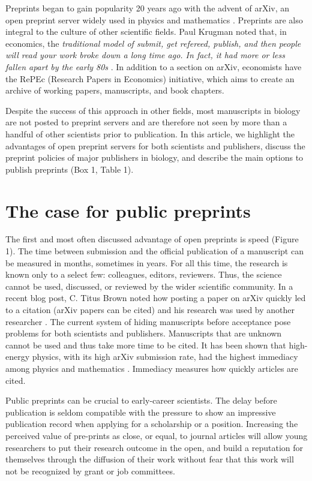 \documentclass[10pt]{article}
\begin{document}
Preprints began to gain popularity 20 years ago with the advent of arXiv, an
open preprint server widely used in physics and mathematics \cite{gin11}.
Preprints are also integral to the culture of other scientific fields.  Paul
Krugman noted that, in economics, the \emph{traditional model of submit, get
refereed, publish, and then people will read your work broke down a long time
ago. In fact, it had more or less fallen apart by the early 80s} \cite{kru12}.
In addition to a section on arXiv, economists have the RePEc (Research Papers in
Economics) initiative, which aims to create an archive of working papers,
manuscripts, and book chapters.

Despite the success of this approach in other fields, most manuscripts in
biology are not posted to preprint servers and are therefore not seen by more
than a handful of other scientists prior to publication. In this article, we
highlight the advantages of open preprint servers for both scientists and
publishers, discuss the preprint policies of major publishers in biology, and
describe the main options to publish preprints (Box 1, Table 1).

\section*{The case for public preprints}

The first and most often discussed advantage of open preprints is
speed (Figure 1). The time between submission and the official
publication of a manuscript can be measured in months, sometimes in years. For
all this time, the research is known only to a select few: colleagues, editors,
reviewers. Thus, the science cannot be used, discussed, or reviewed by the wider
scientific community. In a recent blog post, C. Titus Brown noted how posting a
paper on arXiv quickly led to a citation (arXiv papers can be cited) and his
research was used by another researcher \cite{bro12}. The current system of
hiding manuscripts before acceptance pose problems for both scientists and
publishers. Manuscripts that are unknown cannot be used and thus take more time
to be cited. It has been shown that high-energy physics, with its high arXiv
submission rate, had the highest immediacy among physics and mathematics
\cite{pra05}. Immediacy measures how quickly articles are cited. 

Public preprints can be crucial to early-career scientists. The delay before
publication is seldom compatible with the pressure to show an impressive
publication record when applying for a scholarship or a position. Increasing the
perceived value of pre-prints as close, or equal, to journal articles will allow
young researchers to put their research outcome in the open, and build a
reputation for themselves through the diffusion of their work without fear that
this work will not be recognized by grant or job committees.
\end{document}
